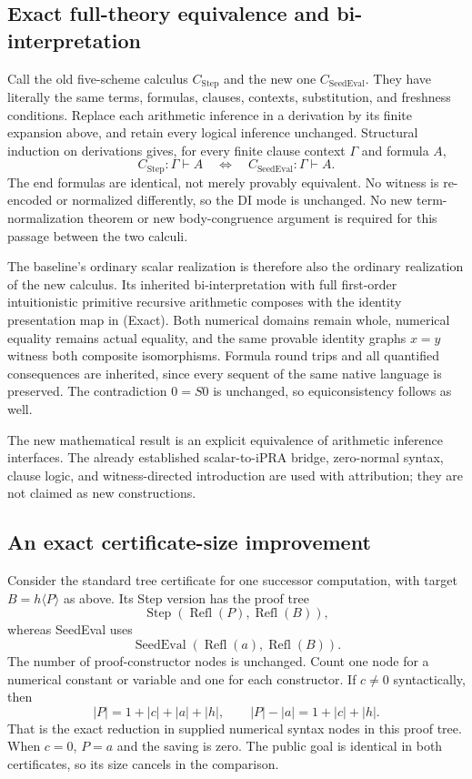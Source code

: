 \documentclass[11pt,letterpaper]{article}
\begin{document}
\subsection{Exact full-theory equivalence and bi-interpretation}

Call the old five-scheme calculus $C_{\mathrm{Step}}$ and the new one
$C_{\mathrm{SeedEval}}$.  They have literally the same terms, formulas,
clauses, contexts, substitution, and freshness conditions.  Replace
each arithmetic inference in a derivation by its finite expansion
above, and retain every logical inference unchanged.  Structural
induction on derivations gives, for every finite clause context
$\Gamma$ and formula $A$,
\[
 C_{\mathrm{Step}}:\Gamma\vdash A
       \quad\Longleftrightarrow\quad
 C_{\mathrm{SeedEval}}:\Gamma\vdash A.
 \tag{Exact}
\]
The end formulas are identical, not merely provably equivalent.
No witness is re-encoded or normalized differently, so the DI mode is
unchanged.  No new term-normalization theorem or new body-congruence
argument is required for this passage between the two calculi.

The baseline's ordinary scalar realization is therefore also the
ordinary realization of the new calculus.  Its inherited
bi-interpretation with full first-order intuitionistic primitive
recursive arithmetic composes with the identity presentation map
in (Exact).  Both numerical domains remain whole, numerical equality
remains actual equality, and the same provable identity graphs $x=y$
witness both composite isomorphisms.  Formula round trips and all
quantified consequences are inherited, since every sequent of the
same native language is preserved.  The contradiction $0=S0$ is
unchanged, so equiconsistency follows as well.

The new mathematical result is an explicit equivalence of arithmetic
inference interfaces.  The already established scalar-to-iPRA bridge,
zero-normal syntax, clause logic, and witness-directed introduction are
used with attribution; they are not claimed as new constructions.

\subsection{An exact certificate-size improvement}

Consider the standard tree certificate for one successor computation,
with target $B=h\langle P\rangle$ as above.  Its Step version has
the proof tree
\[
              \operatorname{Step}(\operatorname{Refl}(P),
                                   \operatorname{Refl}(B)),
\]
whereas SeedEval uses
\[
              \operatorname{SeedEval}(\operatorname{Refl}(a),
                                   \operatorname{Refl}(B)).
\]
The number of proof-constructor nodes is unchanged.  Count one node
for a numerical constant or variable and one for each constructor.
If $c\ne0$ syntactically, then
\[
 |P|=1+|c|+|a|+|h|,
 \qquad
 |P|-|a|=1+|c|+|h|.
\]
That is the exact reduction in supplied numerical syntax nodes in
this proof tree.  When $c=0$, $P=a$ and the saving is zero.
The public goal is identical in both certificates, so its size
cancels in the comparison.
\end{document}
